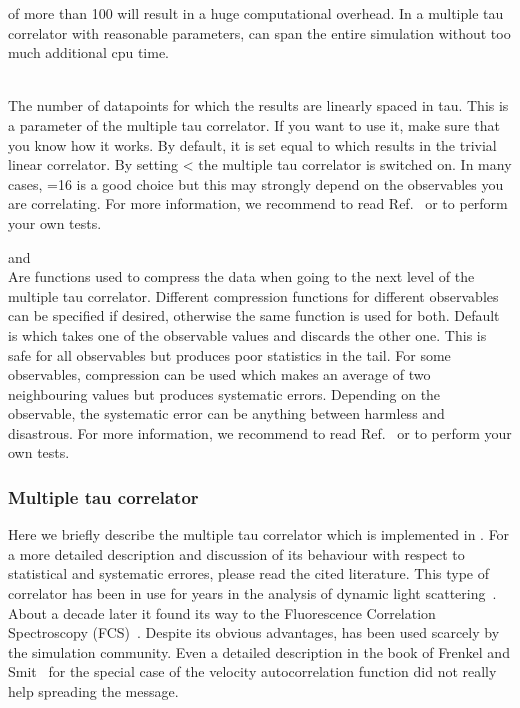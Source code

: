 \begin{arguments}
{  of more than 100 will result in a huge computational overhead.
  In a multiple tau correlator with reasonable parameters, 
   can span the entire simulation without
  too much additional cpu time.}
\item {} \\
  The number of datapoints for which the results are linearly spaced
  in tau.  This is a parameter of the multiple tau correlator. If you
  want to use it, make sure that you know how it works. By default, it
  is set equal to  which results in the trivial linear
  correlator. By setting  <  the multiple
  tau correlator is switched on. In many cases, =16 is a
  good choice but this may strongly depend on the observables you are
  correlating.  For more information, we recommend to read
  Ref.~\cite{ramirez10a} or to perform your own tests.
\item {} and  \\
  Are functions used to compress the data when going to the next level
  of the multiple tau correlator. Different compression functions for
  different observables can be specified if desired, otherwise the
  same function is used for both.  Default is  which
  takes one of the observable values and discards the other one. This
  is safe for all observables but produces poor statistics in the
  tail. For some observables,  compression can be used
  which makes an average of two neighbouring values but produces
  systematic errors.  Depending on the observable, the systematic
  error can be anything between harmless and disastrous. For more
  information, we recommend to read Ref.~\cite{ramirez10a} or to
  perform your own tests.
\end{arguments}

\subsubsection{Multiple tau correlator}
\label{sec:multipleTau}

Here we briefly describe the multiple tau correlator which is implemented in \es.
For a more detailed description and discussion of its behaviour with respect to
statistical and systematic errores, please read the cited literature.
This type of correlator has been in use for years in the analysis of
dynamic light scattering~\cite{schatzel88a}. About a decade later it found its way
to the Fluorescence Correlation Spectroscopy (FCS)~\cite{magatti01a}.
Despite its obvious advantages, has been used scarcely by the simulation community.
Even a detailed description in the book of Frenkel and Smit~\cite{frenkel02b}
for the special case of the velocity autocorrelation function did not really
help spreading the message.

